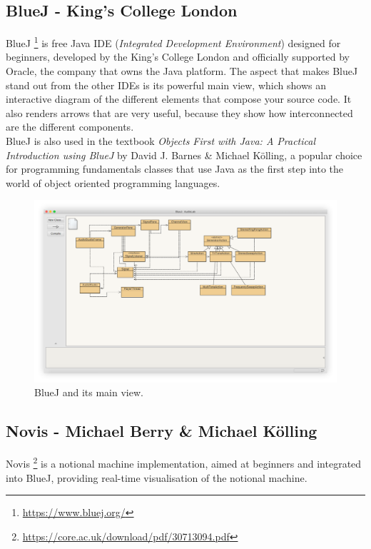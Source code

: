 \documentclass[]{usiinfbachelorproject}
\begin{document}
\subsection{BlueJ - King's College London}

BlueJ \footnote{\url{https://www.bluej.org/}} is free Java IDE (\emph{Integrated Development Environment}) designed for beginners, developed by the King's College London and officially supported by Oracle, the company that owns the Java platform.
The aspect that makes BlueJ stand out from the other IDEs is its powerful main view, which shows an interactive diagram of the different elements that compose your source code. It also renders arrows that are very useful, because they show how interconnected are the different components.\\
BlueJ is also used in the textbook \emph{Objects First with Java: A Practical Introduction using BlueJ} by David J. Barnes \& Michael K\"{o}lling, a popular choice for programming fundamentals classes that use Java as the first step into the world of object oriented programming languages.

\begin{figure}[h]
\centering
\includegraphics[width=\textwidth]{figures/bluej_shadow.png}
\caption {BlueJ and its main view.}
\end{figure}

\subsection{Novis - Michael Berry \& Michael K\"{o}lling}

Novis \footnote{\url{https://core.ac.uk/download/pdf/30713094.pdf}} is a notional machine implementation, aimed at beginners and integrated into BlueJ, providing real-time visualisation of the notional machine.
\end{document}
